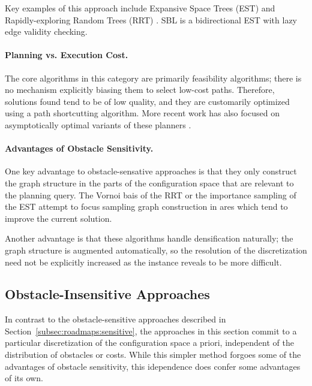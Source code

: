 Key examples of this approach include
Expansive Space Trees (EST) \citep{hsu1997expansive}
and Rapidly-exploring Random Trees (RRT)
\citep{lavalle1998rrt, kuffner2000rrtconnect}.
SBL \citep{sanchezante2001sbl}
is a bidirectional EST with lazy edge validity checking.

\paragraph{Planning vs. Execution Cost.}
The core algorithms in this category are primarily feasibility
algorithms;
there is no mechanism explicitly biasing them to select
low-cost paths.
Therefore, solutions found tend to be of low quality,
and they are customarily optimized using a path shortcutting
algorithm.
More recent work has also focused on asymptotically optimal variants
of these planners \citep{karaman2010rrtstar}.

\paragraph{Advantages of Obstacle Sensitivity.}
One key advantage to obstacle-sensative approaches is that
they only construct the graph structure in the parts of the
configuration space that are relevant to the planning query.
The Vornoi bais of the RRT or the importance sampling of the EST
attempt to focus sampling graph construction in ares
which tend to improve the current solution.

Another advantage is that these algorithms handle densification
naturally;
the graph structure is augmented automatically,
so the resolution of the discretization need not be explicitly
increased as the instance reveals to be more difficult.





\subsection{Obstacle-Insensitive Approaches}

In contrast to the obstacle-sensitive approaches described in
Section~\ref{subsec:roadmaps:sensitive},
the approaches in this section commit to a particular discretization
of the configuration space a priori,
independent of the distribution of obstacles or costs.
While this simpler method forgoes some of the advantages of
obstacle sensitivity,
this idependence does confer some advantages of its own.

